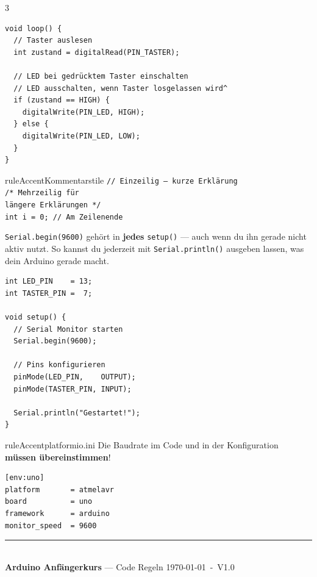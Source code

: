 \documentclass[a4paper,10pt,landscape]{article}
\newcommand\version{V1.0}
\begin{document}
\begin{multicols}{3}
\begin{goodbox}
\begin{lstlisting}
void loop() {
  // Taster auslesen
  int zustand = digitalRead(PIN_TASTER);

  // LED bei gedrücktem Taster einschalten
  // LED ausschalten, wenn Taster losgelassen wird^
  if (zustand == HIGH) {
    digitalWrite(PIN_LED, HIGH);
  } else {
    digitalWrite(PIN_LED, LOW);
  }
}
\end{lstlisting}
\end{goodbox}

\begin{regelbox}{ruleAccent}{\faLightbulb\enspace Kommentarstile}
  \fontsize{8}{9.5}\selectfont
  \texttt{// Einzeilig — kurze Erklärung}\\
  \texttt{/* Mehrzeilig für\\
  \phantom{xx}längere Erklärungen */}\\
  \texttt{int i = 0; // Am Zeilenende}
\end{regelbox}

\columnbreak



\lstinline|Serial.begin(9600)| gehört in \textbf{jedes}
\lstinline|setup()| — auch wenn du ihn gerade nicht aktiv
nutzt. So kannst du jederzeit mit \lstinline|Serial.println()|
ausgeben lassen, was dein Arduino gerade macht.

\begin{goodbox}
\begin{lstlisting}
int LED_PIN    = 13;
int TASTER_PIN =  7;

void setup() {
  // Serial Monitor starten
  Serial.begin(9600);

  // Pins konfigurieren
  pinMode(LED_PIN,    OUTPUT);
  pinMode(TASTER_PIN, INPUT);

  Serial.println("Gestartet!");
}
\end{lstlisting}
\end{goodbox}

\vspace{4pt}

\begin{regelbox}{ruleAccent}{\faFile*[regular]\enspace platformio.ini}
  \fontsize{8}{9.5}\selectfont
  Die Baudrate im Code und in der Konfiguration \textbf{müssen übereinstimmen}!\\[3pt]
\begin{lstlisting}[language={},
  backgroundcolor=\color{white},
  basicstyle=\ttfamily\fontsize{7.5}{9}\selectfont]
[env:uno]
platform       = atmelavr
board          = uno
framework      = arduino
monitor_speed  = 9600
\end{lstlisting}
\end{regelbox}

\end{multicols}

\vfill
\noindent
{\color{arduinoBlue!40}\rule{\linewidth}{0.5pt}}\\[1pt]
{\fontsize{7}{8}\selectfont\color{gray}
 \textbf{Arduino Anfängerkurs} — Code Regeln
 \hfill
 \today\ -\ \version
}
\end{document}

